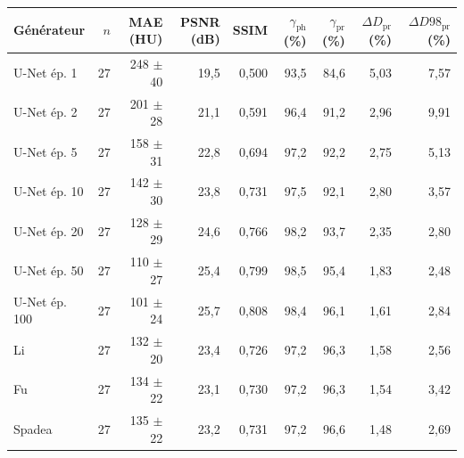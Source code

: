 \begin{tabular}{lrrrrrrrr}
\toprule
Générateur & $n$ & MAE (HU) & PSNR (dB) & SSIM & $\gamma_\text{ph}$ (\%) & $\gamma_\text{pr}$ (\%) & $\Delta D_\text{pr}$ (\%) & $\Delta D98_\text{pr}$ (\%) \\
\midrule
U-Net ép. 1 & 27 & 248 $\pm$ 40 & 19,5 & 0,500 & 93,5 & 84,6 & 5,03 & 7,57 \\
U-Net ép. 2 & 27 & 201 $\pm$ 28 & 21,1 & 0,591 & 96,4 & 91,2 & 2,96 & 9,91 \\
U-Net ép. 5 & 27 & 158 $\pm$ 31 & 22,8 & 0,694 & 97,2 & 92,2 & 2,75 & 5,13 \\
U-Net ép. 10 & 27 & 142 $\pm$ 30 & 23,8 & 0,731 & 97,5 & 92,1 & 2,80 & 3,57 \\
U-Net ép. 20 & 27 & 128 $\pm$ 29 & 24,6 & 0,766 & 98,2 & 93,7 & 2,35 & 2,80 \\
U-Net ép. 50 & 27 & 110 $\pm$ 27 & 25,4 & 0,799 & 98,5 & 95,4 & 1,83 & 2,48 \\
U-Net ép. 100 & 27 & 101 $\pm$ 24 & 25,7 & 0,808 & 98,4 & 96,1 & 1,61 & 2,84 \\
\midrule
Li & 27 & 132 $\pm$ 20 & 23,4 & 0,726 & 97,2 & 96,3 & 1,58 & 2,56 \\
Fu & 27 & 134 $\pm$ 22 & 23,1 & 0,730 & 97,2 & 96,3 & 1,54 & 3,42 \\
Spadea & 27 & 135 $\pm$ 22 & 23,2 & 0,731 & 97,2 & 96,6 & 1,48 & 2,69 \\
\bottomrule
\end{tabular}
